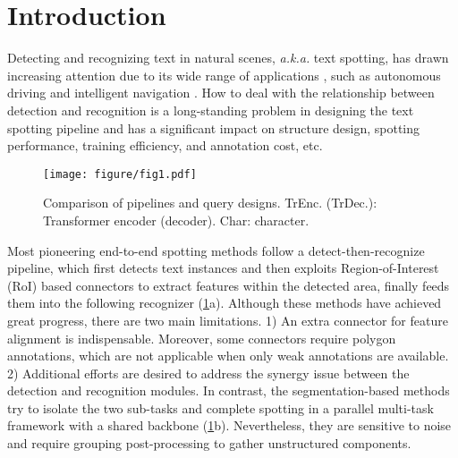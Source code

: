 \documentclass[10pt,twocolumn,letterpaper]{article}
\begin{document}
\section{Introduction}
\label{sec:intro}
Detecting and recognizing text in natural scenes, \textit{a.k.a.} text spotting, has drawn increasing attention due to its wide range of applications \cite{ye2014text,zhang2020empowering,chen2021text,long2021scene}, such as autonomous driving \cite{zhang2021character} and intelligent navigation \cite{desouza2002vision}. 
How to deal with the relationship between detection and recognition is a long-standing problem in designing the text spotting pipeline and has a significant impact on structure design, spotting performance, training efficiency, and annotation cost, etc.

\begin{figure}[!t]
    \centering
    \texttt{[image: figure/fig1.pdf]}
    \caption{Comparison of pipelines and query designs. TrEnc. (TrDec.): Transformer encoder (decoder). Char: character.}
    \label{fig:1}
    \vspace{-6mm}
\end{figure}

Most pioneering end-to-end spotting methods \cite{he2018end,liu2018fots,liu2020abcnet, liu2021abcnet,wang2021pan++,lyu2018mask,liao2020mask,ronen2022glass,qin2019towards} follow a detect-then-recognize pipeline, which first detects text instances and then exploits Region-of-Interest (RoI) based connectors to extract features within the detected area, finally feeds them into the following recognizer (\cref{fig:1}a). Although these methods have achieved great progress, there are two main limitations. 1) An extra connector for feature alignment is indispensable. Moreover, some connectors require polygon annotations, which are not applicable when only weak annotations are available. 2) Additional efforts are desired to address the synergy issue \cite{zhong2021arts, huang2022swintextspotter} between the detection and recognition modules. In contrast, the segmentation-based methods \cite{xing2019convolutional,wang2021pgnet} try to isolate the two sub-tasks and complete spotting in a parallel multi-task framework with a shared backbone (\cref{fig:1}b).
Nevertheless, they are sensitive to noise and require grouping post-processing to gather unstructured components.
\end{document}
